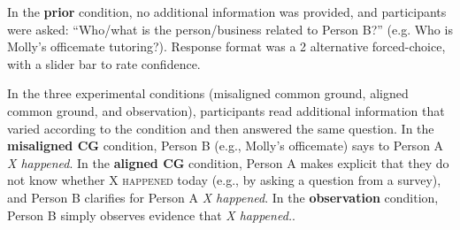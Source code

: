 \documentclass[10pt,letterpaper]{article}
\begin{document}
In the \textbf{prior} condition, no additional information was provided, and participants were asked: ``Who/what is the person/business related to Person B?'' (e.g. Who is Molly's officemate tutoring?).  Response format was a 2 alternative forced-choice, with a slider bar to rate confidence.

In the three experimental conditions (misaligned common ground, aligned common ground, and observation), participants read additional information that varied according to the condition and then answered the same question.
In the \textbf{misaligned CG} condition,  Person B (e.g., Molly's officemate) says to Person A \emph{X happened}. 
In the \textbf{aligned CG} condition, Person A makes explicit that they do not know whether \textsc{X happened} today (e.g., by asking a question from a survey), and Person B clarifies for Person A \emph{X happened}.
In the \textbf{observation} condition, Person B simply observes evidence that \emph{X happened.}.
\end{document}
